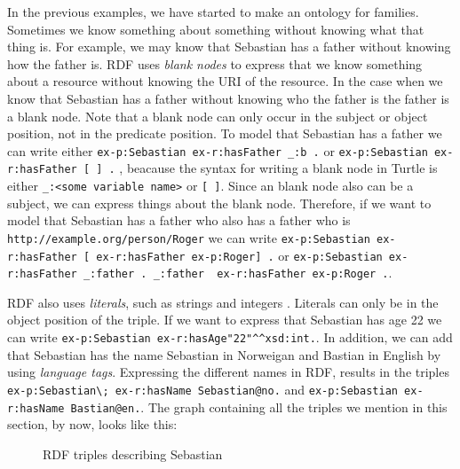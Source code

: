 \begin{figure}[h]
    

\end{figure}

\para
In the previous examples, we have started to make an ontology for families. Sometimes we know something about something without knowing what that thing is. For example, we may know that Sebastian has a father without knowing how the father is. RDF uses \emph{blank nodes} to express that we know something about a resource without knowing the URI of the resource. In the case when we know that Sebastian has a father without knowing who the father is the father is a blank node. Note that a blank node can only  occur in the subject or object position, not in the predicate position. To model that Sebastian has a father we can write either \lstinline{ex-p:Sebastian ex-r:hasFather _:b .} or \lstinline{ex-p:Sebastian ex-r:hasFather [ ] .} , beacause the syntax for writing a blank node in Turtle is either \lstinline{_:<some variable name>} or \lstinline{[ ]}. Since an blank node also can be a subject, we can express things about the blank node. Therefore, if we want to model that Sebastian has a father who also has a father who is \lstinline{http://example.org/person/Roger} we can write \lstinline{ex-p:Sebastian ex-r:hasFather [ ex-r:hasFather ex-p:Roger] .} or \lstinline{ex-p:Sebastian ex-r:hasFather _:father . _:father  ex-r:hasFather ex-p:Roger .}.

\para
RDF also uses \emph{literals}, such as strings and integers \autocite{W3C_RDF}. Literals can only be in the object position of the triple. If we want to express that Sebastian has age 22 we can write \lstinline{ex-p:Sebastian ex-r:hasAge"22"^^xsd:int.}. In addition, we can add that Sebastian has the name Sebastian in Norweigan and Bastian in English by using \emph{language tags}. Expressing the different names in RDF, results in the triples \lstinline{ex-p:Sebastian\; ex-r:hasName Sebastian@no.} and \lstinline{ex-p:Sebastian ex-r:hasName Bastian@en.}. The graph containing all the triples we mention in this section, by now, looks like this:

\begin{figure}[h]
    \begin{example}
        \label{rdf1}
        RDF triples describing Sebastian 
    \end{example}
    
\end{figure}

